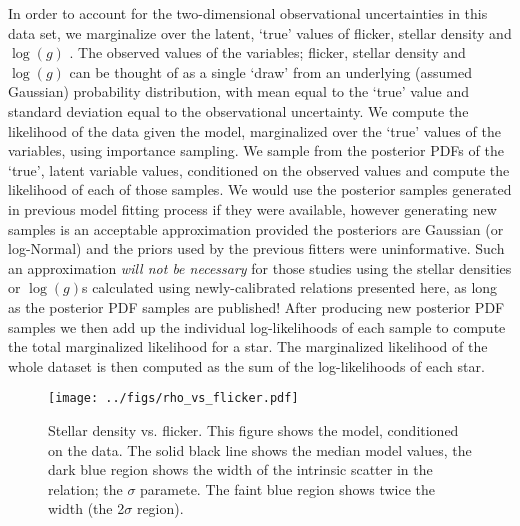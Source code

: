 In order to account for the two-dimensional observational uncertainties in
this data set, we marginalize over the latent, `true' values of flicker,
stellar density and $\log(g)$
\citep[see, e.g.][]{hogg:2010, foreman-mackey:2014, rogers:2015, angus:2015}.
The observed values of the variables; flicker, stellar density and $\log(g)$
can be thought of as a single `draw' from an underlying (assumed Gaussian)
probability distribution, with mean equal to the `true' value and standard
deviation equal to the observational uncertainty.
We compute the likelihood of the data given the model, marginalized over the
`true' values of the variables, using importance sampling.
We sample from the posterior PDFs of the `true', latent variable values,
conditioned on the observed values and compute the likelihood of each of those
samples.
We would use the posterior samples generated in previous model fitting process
if they were available, however generating new samples is an acceptable
approximation provided the posteriors are Gaussian (or log-Normal) and the
priors used by the previous fitters were uninformative.
Such an approximation {\it will not be necessary} for those studies using
the stellar densities or $\log(g)$s calculated using newly-calibrated relations
presented here, as long as the posterior PDF samples are published!
After producing new posterior PDF samples we then add up the individual log-likelihoods of each sample to compute the total marginalized likelihood for a star.
The marginalized likelihood of the whole dataset is then computed as the sum
of the log-likelihoods of each star.

\begin{figure}
\begin{center}
\texttt{[image: ../figs/rho\_vs\_flicker.pdf]}
\caption{
Stellar density vs. flicker. This figure shows the model, conditioned on the
data. The solid black line shows the median model values, the dark blue
region shows the width of the intrinsic scatter in the relation; the $\sigma$
paramete. The faint blue region shows twice the width (the 2$\sigma$ region).
}
\label{fig:rhostar}
\end{center}
\end{figure}

